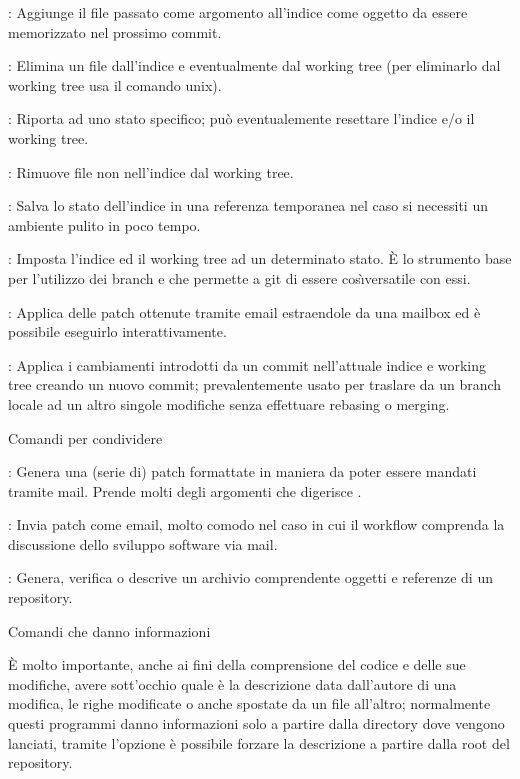 \elemento{}: Aggiunge il file passato come argomento all'indice come
oggetto da essere memorizzato nel prossimo commit.

\elemento{}: Elimina un file dall'indice e eventualmente dal working tree
(per eliminarlo dal working tree usa il comando  unix).

\elemento{}: Riporta  ad uno stato specifico; pu\`o
eventualemente resettare l'indice e/o il working tree.

\elemento{}: Rimuove file non nell'indice dal working tree.

\elemento{}: Salva lo stato dell'indice in una referenza temporanea
nel caso si necessiti un ambiente pulito in poco tempo.

\elemento{}: Imposta l'indice ed il working tree ad un determinato
stato. \`E lo strumento base per l'utilizzo dei branch e che permette a git di
essere cos\`\i versatile con essi.

\elemento{}: Applica delle patch ottenute tramite email estraendole da
una mailbox ed \`e possibile eseguirlo interattivamente.

\elemento{}: Applica i cambiamenti introdotti da un commit
nell'attuale indice e working tree creando un nuovo commit; prevalentemente
usato per traslare da un branch locale ad un altro singole modifiche senza
effettuare rebasing o merging.

\sezione Comandi per condividere

\elemento{}: Genera una (serie di) patch formattate in
maniera da poter essere mandati tramite mail. Prende molti degli argomenti che
digerisce .

\elemento{}: Invia patch come email, molto comodo nel caso in cui
il workflow comprenda la discussione dello sviluppo software via mail.

\elemento{}: Genera, verifica o descrive un archivio comprendente
oggetti e referenze di un repository.

\sezione Comandi che danno informazioni

\`E molto importante, anche ai fini della comprensione del codice e delle sue
modifiche, avere sott'occhio quale \`e la descrizione data dall'autore di una
modifica, le righe modificate o anche spostate da un file all'altro; normalmente
questi programmi danno informazioni solo a partire dalla directory dove vengono
lanciati, tramite l'opzione  \`e possibile forzare la
descrizione a partire dalla root del repository.

